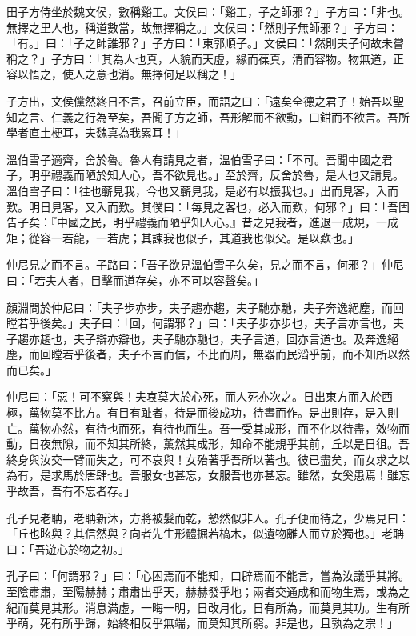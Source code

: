 
\begin{pinyinscope}
田子方侍坐於魏文侯，數稱谿工。文侯曰：「谿工，子之師邪？」子方曰：「非也。無擇之里人也，稱道數當，故無擇稱之。」文侯曰：「然則子無師邪？」子方曰：「有。」曰：「子之師誰邪？」子方曰：「東郭順子。」文侯曰：「然則夫子何故未嘗稱之？」子方曰：「其為人也真，人貌而天虛，緣而葆真，清而容物。物無道，正容以悟之，使人之意也消。無擇何足以稱之！」

子方出，文侯儻然終日不言，召前立臣，而語之曰：「遠矣全德之君子！始吾以聖知之言、仁義之行為至矣，吾聞子方之師，吾形解而不欲動，口鉗而不欲言。吾所學者直土梗耳，夫魏真為我累耳！」

溫伯雪子適齊，舍於魯。魯人有請見之者，溫伯雪子曰：「不可。吾聞中國之君子，明乎禮義而陋於知人心，吾不欲見也。」至於齊，反舍於魯，是人也又請見。溫伯雪子曰：「往也蘄見我，今也又蘄見我，是必有以振我也。」出而見客，入而歎。明日見客，又入而歎。其僕曰：「每見之客也，必入而歎，何邪？」曰：「吾固告子矣：『中國之民，明乎禮義而陋乎知人心。』昔之見我者，進退一成規，一成矩；從容一若龍，一若虎；其諫我也似子，其道我也似父。是以歎也。」

仲尼見之而不言。子路曰：「吾子欲見溫伯雪子久矣，見之而不言，何邪？」仲尼曰：「若夫人者，目擊而道存矣，亦不可以容聲矣。」

顏淵問於仲尼曰：「夫子步亦步，夫子趨亦趨，夫子馳亦馳，夫子奔逸絕塵，而回瞠若乎後矣。」夫子曰：「回，何謂邪？」曰：「夫子步亦步也，夫子言亦言也，夫子趨亦趨也，夫子辯亦辯也，夫子馳亦馳也，夫子言道，回亦言道也。及奔逸絕塵，而回瞠若乎後者，夫子不言而信，不比而周，無器而民滔乎前，而不知所以然而已矣。」

仲尼曰：「惡！可不察與！夫哀莫大於心死，而人死亦次之。日出東方而入於西極，萬物莫不比方。有目有趾者，待是而後成功，待晝而作。是出則存，是入則亡。萬物亦然，有待也而死，有待也而生。吾一受其成形，而不化以待盡，效物而動，日夜無隙，而不知其所終，薰然其成形，知命不能規乎其前，丘以是日徂。吾終身與汝交一臂而失之，可不哀與！女殆著乎吾所以著也。彼已盡矣，而女求之以為有，是求馬於唐肆也。吾服女也甚忘，女服吾也亦甚忘。雖然，女奚患焉！雖忘乎故吾，吾有不忘者存。」

孔子見老聃，老聃新沐，方將被髮而乾，慹然似非人。孔子便而待之，少焉見曰：「丘也眩與？其信然與？向者先生形體掘若槁木，似遺物離人而立於獨也。」老聃曰：「吾遊心於物之初。」

孔子曰：「何謂邪？」曰：「心困焉而不能知，口辟焉而不能言，嘗為汝議乎其將。至陰肅肅，至陽赫赫；肅肅出乎天，赫赫發乎地；兩者交通成和而物生焉，或為之紀而莫見其形。消息滿虛，一晦一明，日改月化，日有所為，而莫見其功。生有所乎萌，死有所乎歸，始終相反乎無端，而莫知其所窮。非是也，且孰為之宗！」


\end{pinyinscope}
